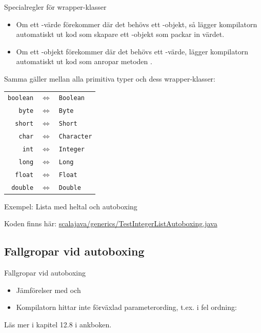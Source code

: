 \begin{Slide}{Specialregler för wrapper-klasser}\footnotesize
\begin{itemize}
\item Om ett -värde förekommer där det behövs ett -objekt, så lägger kompilatorn automatiskt ut kod som skapare ett -objekt som packar in värdet.
\item Om ett -objekt förekommer där det behövs ett -värde, lägger kompilatorn automatiskt ut kod som anropar metoden .
\end{itemize}
Samma gäller mellan alla primitiva typer och dess wrapper-klasser: 
\begin{table}
\center
\begin{tabular}{r c l}
 {\lstinline!boolean!} &$\Leftrightarrow$& {\lstinline!Boolean!} \\
 {\lstinline!byte!} &$\Leftrightarrow$& {\lstinline!Byte!}\\
 {\lstinline!short!}&$\Leftrightarrow$& {\lstinline!Short!}\\
 {\lstinline!char!} &$\Leftrightarrow$& {\lstinline!Character!}\\
 {\lstinline!int!} &$\Leftrightarrow$& {\lstinline!Integer!}\\
 {\lstinline!long!} &$\Leftrightarrow$& {\lstinline!Long!}\\
 {\lstinline!float!} &$\Leftrightarrow$& {\lstinline!Float!}\\
 {\lstinline!double!} &$\Leftrightarrow$&{\lstinline!Double!}\\
\end{tabular}
\end{table}
\end{Slide}

\begin{Slide}{Exempel: Lista med heltal och autoboxing}

\scriptsize Koden finns här: \href{https://github.com/lunduniversity/introprog/tree/master/compendium/examples/scalajava/generics/TestIntegerList.java}{scalajava/generics/TestIntegerListAutoboxing.java}
\end{Slide}

\subsection{Fallgropar vid autoboxing}
\begin{Slide}{Fallgropar vid autoboxing}
\begin{itemize}
\item Jämförelser med \code{==} och \code{!=}
\item Kompilatorn hittar inte förväxlad parameterording, t.ex.  i fel ordning: \sout{}
\end{itemize}
Läs mer i kapitel 12.8 i ankboken.
\end{Slide}

